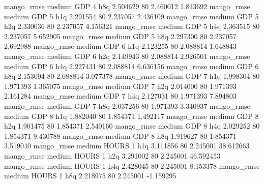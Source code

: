        mango_rmse     medium      GDP                 4                  h8q  2.504629 80       2.460012           1.813692
       mango_rmse     medium      GDP                 5                  h1q  2.291554 80       2.237057           2.436109
       mango_rmse     medium      GDP                 5                  h2q  2.330036 80       2.237057           4.156321
       mango_rmse     medium      GDP                 5                  h4q  2.363515 80       2.237057           5.652905
       mango_rmse     medium      GDP                 5                  h8q  2.297300 80       2.237057           2.692988
       mango_rmse     medium      GDP                 6                  h1q  2.123255 80       2.088814           1.648843
       mango_rmse     medium      GDP                 6                  h2q  2.149943 80       2.088814           2.926501
       mango_rmse     medium      GDP                 6                  h4q  2.227431 80       2.088814           6.636156
       mango_rmse     medium      GDP                 6                  h8q  2.153094 80       2.088814           3.077378
       mango_rmse     medium      GDP                 7                  h1q  1.998304 80       1.971393           1.365075
       mango_rmse     medium      GDP                 7                  h2q  2.014000 80       1.971393           2.161284
       mango_rmse     medium      GDP                 7                  h4q  2.127031 80       1.971393           7.894803
       mango_rmse     medium      GDP                 7                  h8q  2.037256 80       1.971393           3.340937
       mango_rmse     medium      GDP                 8                  h1q  1.882040 80       1.854371           1.492117
       mango_rmse     medium      GDP                 8                  h2q  1.901475 80       1.854371           2.540160
       mango_rmse     medium      GDP                 8                  h4q  2.029252 80       1.854371           9.430788
       mango_rmse     medium      GDP                 8                  h8q  1.919627 80       1.854371           3.519040
       mango_rmse     medium    HOURS                 1                  h1q  3.111856 80       2.245001          38.612663
       mango_rmse     medium    HOURS                 1                  h2q  3.291002 80       2.245001          46.592453
       mango_rmse     medium    HOURS                 1                  h4q  2.428045 80       2.245001           8.153378
       mango_rmse     medium    HOURS                 1                  h8q  2.218975 80       2.245001          -1.159295
